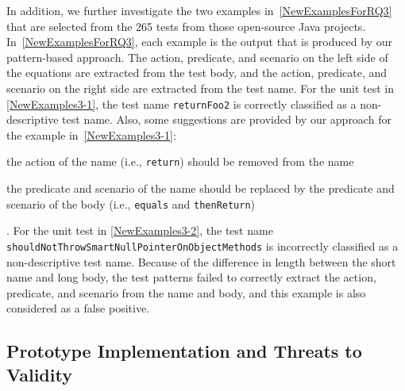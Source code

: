 \documentclass[proposal.tex]{subfiles}
\begin{document}
In addition, we further investigate the two examples in~\cref{NewExamplesForRQ3} that are selected from the \num{265} tests from those open-source Java projects.
%
In~\cref{NewExamplesForRQ3}, each example is the output that is produced by our pattern-based approach.
%
The action, predicate, and scenario on the left side of the equations are extracted from the test body, and the action, predicate, and scenario on the right side are extracted from the test name.
%
For the unit test in \cref{NewExamples3-1}, the test name \texttt{returnFoo2} is correctly classified as a non-descriptive test name.
%
Also, some suggestions are provided by our approach for the example in~\cref{NewExamples3-1}: 
\begin{enumerate*}
    \item the action of the name (i.e., \texttt{return}) should be removed from the name
    \item the predicate and scenario of the name should be replaced by the predicate and scenario of the body (i.e., \texttt{equals} and \texttt{thenReturn})
\end{enumerate*}.
%
For the unit test in \cref{NewExamples3-2}, the test name \texttt{shouldNotThrowSmartNullPointerOnObjectMethods} is incorrectly classified as a non-descriptive test name.
%
Because of the difference in length between the short name and long body, the test patterns failed to correctly extract the action, predicate, and scenario from the name and body, and this example is also considered as a false positive.

\subsection{Prototype Implementation and Threats to Validity}
\label{sec:implementation&threats}
\end{document}
